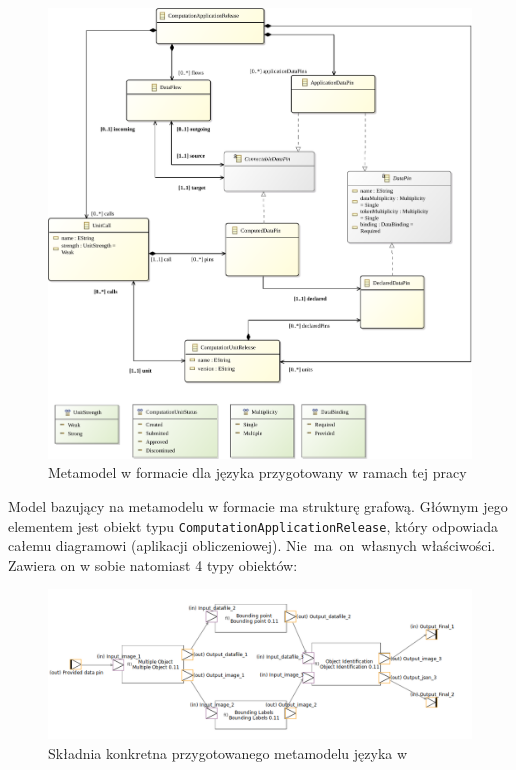\begin{figure}[!ht]
	\centering

	\includegraphics[width=0.92\linewidth]{./images/cal-emf-metamodel.pdf}
	\caption{Metamodel w formacie \Ecore{} dla języka \CAL{} przygotowany w
		ramach tej pracy}\label{rys:cal-emf-metamodel}
\end{figure}

Model bazujący na metamodelu w formacie \Ecore{} ma strukturę grafową. Głównym
jego elementem jest obiekt typu
\texttt{Computation\-Application\-Release}, który odpowiada całemu diagramowi
(aplikacji obliczeniowej). Nie~ma~on~własnych właściwości. Zawiera on w sobie
natomiast 4 typy obiektów:

\begin{figure}[!hb]
	\centering

	\includegraphics[width=0.99\linewidth]{./images/sirius-desktop-cal-example-model.png}
	\caption{Składnia konkretna przygotowanego metamodelu języka \CAL{} w
		\SiriusDesktop{}}\label{rys:sirius-desktop-cal-example-model}
\end{figure}

